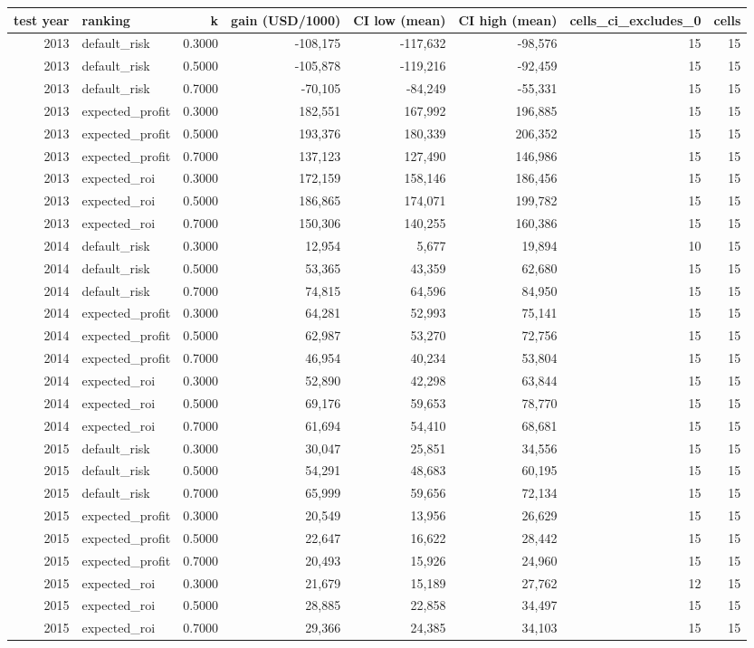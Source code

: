 \begin{tabular}{rlrrrrrr}
\toprule
test year & ranking & k & gain (USD/1000) & CI low (mean) & CI high (mean) & cells\_ci\_excludes\_0 & cells \\
\midrule
2013 & default\_risk & 0.3000 & -108,175 & -117,632 & -98,576 & 15 & 15 \\
2013 & default\_risk & 0.5000 & -105,878 & -119,216 & -92,459 & 15 & 15 \\
2013 & default\_risk & 0.7000 & -70,105 & -84,249 & -55,331 & 15 & 15 \\
2013 & expected\_profit & 0.3000 & 182,551 & 167,992 & 196,885 & 15 & 15 \\
2013 & expected\_profit & 0.5000 & 193,376 & 180,339 & 206,352 & 15 & 15 \\
2013 & expected\_profit & 0.7000 & 137,123 & 127,490 & 146,986 & 15 & 15 \\
2013 & expected\_roi & 0.3000 & 172,159 & 158,146 & 186,456 & 15 & 15 \\
2013 & expected\_roi & 0.5000 & 186,865 & 174,071 & 199,782 & 15 & 15 \\
2013 & expected\_roi & 0.7000 & 150,306 & 140,255 & 160,386 & 15 & 15 \\
2014 & default\_risk & 0.3000 & 12,954 & 5,677 & 19,894 & 10 & 15 \\
2014 & default\_risk & 0.5000 & 53,365 & 43,359 & 62,680 & 15 & 15 \\
2014 & default\_risk & 0.7000 & 74,815 & 64,596 & 84,950 & 15 & 15 \\
2014 & expected\_profit & 0.3000 & 64,281 & 52,993 & 75,141 & 15 & 15 \\
2014 & expected\_profit & 0.5000 & 62,987 & 53,270 & 72,756 & 15 & 15 \\
2014 & expected\_profit & 0.7000 & 46,954 & 40,234 & 53,804 & 15 & 15 \\
2014 & expected\_roi & 0.3000 & 52,890 & 42,298 & 63,844 & 15 & 15 \\
2014 & expected\_roi & 0.5000 & 69,176 & 59,653 & 78,770 & 15 & 15 \\
2014 & expected\_roi & 0.7000 & 61,694 & 54,410 & 68,681 & 15 & 15 \\
2015 & default\_risk & 0.3000 & 30,047 & 25,851 & 34,556 & 15 & 15 \\
2015 & default\_risk & 0.5000 & 54,291 & 48,683 & 60,195 & 15 & 15 \\
2015 & default\_risk & 0.7000 & 65,999 & 59,656 & 72,134 & 15 & 15 \\
2015 & expected\_profit & 0.3000 & 20,549 & 13,956 & 26,629 & 15 & 15 \\
2015 & expected\_profit & 0.5000 & 22,647 & 16,622 & 28,442 & 15 & 15 \\
2015 & expected\_profit & 0.7000 & 20,493 & 15,926 & 24,960 & 15 & 15 \\
2015 & expected\_roi & 0.3000 & 21,679 & 15,189 & 27,762 & 12 & 15 \\
2015 & expected\_roi & 0.5000 & 28,885 & 22,858 & 34,497 & 15 & 15 \\
2015 & expected\_roi & 0.7000 & 29,366 & 24,385 & 34,103 & 15 & 15 \\
\bottomrule
\end{tabular}
